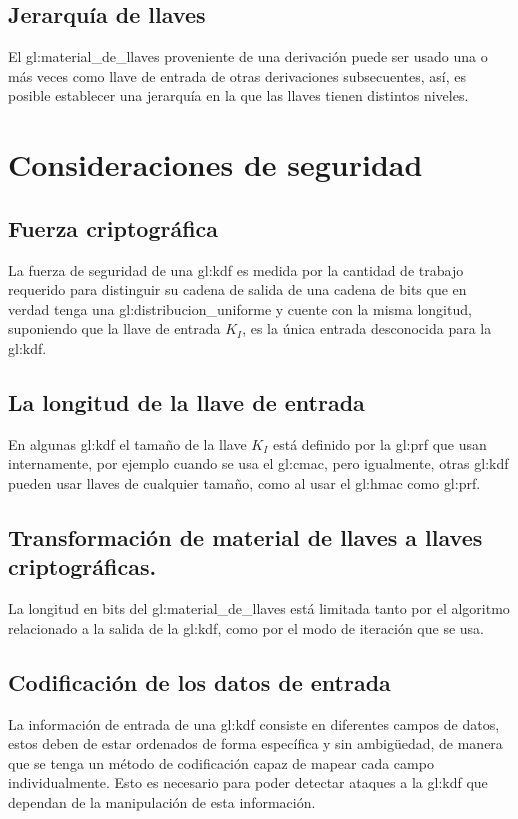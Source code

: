 \subsection{Jerarquía de llaves}
El \gls{gl:material_de_llaves} proveniente de una derivación puede ser usado
una o más veces como llave de entrada de otras derivaciones subsecuentes, así,
es posible establecer una jerarquía en la que las llaves tienen distintos
niveles.

\section{Consideraciones de seguridad}

\subsection{Fuerza criptográfica}
La fuerza de seguridad de una \gls{gl:kdf} es medida por la cantidad de
trabajo requerido para distinguir su cadena de salida de una cadena de bits
que en verdad tenga una \gls{gl:distribucion_uniforme} y cuente con la misma
longitud, suponiendo que la llave de entrada $K_I$, es la única entrada
desconocida para la \gls{gl:kdf}.

\subsection{La longitud de la llave de entrada}
En algunas \gls{gl:kdf} el tamaño de la llave $K_I$ está definido por la
\gls{gl:prf} que usan internamente, por ejemplo cuando se usa el \gls{gl:cmac},
pero igualmente, otras \gls{gl:kdf} pueden usar llaves de cualquier tamaño,
como al usar el \gls{gl:hmac} como \gls{gl:prf}.

\subsection{Transformación de material de llaves a llaves criptográficas.}
La longitud en bits del \gls{gl:material_de_llaves} está limitada tanto por
el algoritmo relacionado a la salida de la \gls{gl:kdf}, como por el modo de
iteración que se usa.

\subsection{Codificación de los datos de entrada}
La información de entrada de una \gls{gl:kdf} consiste en diferentes campos
de datos, estos deben de estar ordenados de forma específica y sin ambigüedad,
de manera que se tenga un método de codificación capaz de mapear cada campo
individualmente. Esto es necesario para poder detectar ataques a la
\gls{gl:kdf} que dependan de la manipulación de esta información.

